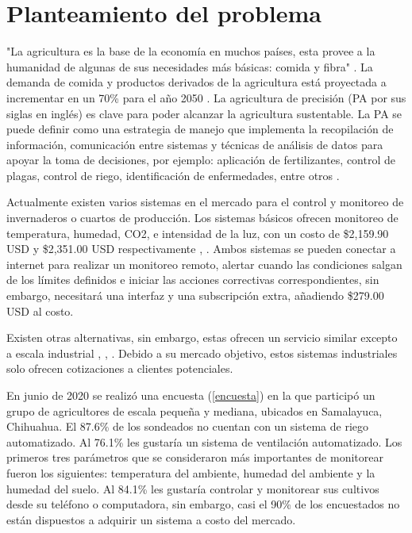 \section{Planteamiento del problema}

"La agricultura es la base de la economía en muchos países, esta provee a la humanidad de algunas de sus necesidades más básicas: comida y fibra" \cite{appsremotesensing}. La demanda de comida y productos derivados de la agricultura está proyectada a incrementar en un 70\% para el año 2050 \cite{wik_pingali_brocai_2008}. La agricultura de precisión (PA por sus siglas en inglés) es clave para poder alcanzar la agricultura sustentable. La PA se puede definir como una estrategia de manejo que implementa la recopilación de información, comunicación entre sistemas y técnicas de análisis de datos para apoyar la toma de decisiones, por ejemplo: aplicación de fertilizantes, control de plagas, control de riego, identificación de enfermedades, entre otros \cite{appsremotesensing}.

Actualmente existen varios sistemas en el mercado para el control y monitoreo de invernaderos o cuartos de producción. Los sistemas básicos ofrecen monitoreo de temperatura, humedad, CO2, e intensidad de la luz, con un costo de \$2,159.90 USD y \$2,351.00 USD respectivamente \cite{intelliclimate_kit_2021}, \cite{smartbee_kit_2021}. Ambos sistemas se pueden conectar a internet para realizar un monitoreo remoto, alertar cuando las condiciones salgan de los límites definidos e iniciar las acciones correctivas correspondientes, sin embargo, \cite{intelliclimate_kit_2021} necesitará una interfaz y una subscripción extra, añadiendo \$279.00 USD al costo. 

Existen otras alternativas, sin embargo, estas ofrecen un servicio similar excepto a escala industrial \cite{ceres_greenhouse_solutions_2021}, \cite{autogrow_climate_control_2021}, \cite{climate_control_2021}. Debido a su mercado objetivo, estos sistemas industriales solo ofrecen cotizaciones a clientes potenciales.

En junio de 2020 se realizó una encuesta (\ref{encuesta}) en la que participó un grupo de agricultores de escala pequeña y mediana, ubicados en Samalayuca, Chihuahua. El 87.6\% de los sondeados no cuentan con un sistema de riego automatizado. Al 76.1\% les gustaría un sistema de ventilación automatizado. Los primeros tres parámetros que se consideraron más importantes de monitorear fueron los siguientes: temperatura del ambiente, humedad del ambiente y la humedad del suelo. Al 84.1\% les gustaría controlar y monitorear sus cultivos desde su teléfono o computadora, sin embargo, casi el 90\% de los encuestados no están dispuestos a adquirir un sistema a costo del mercado.

